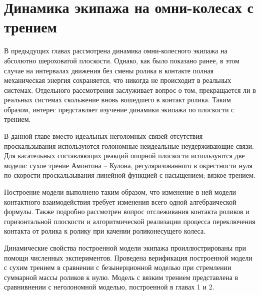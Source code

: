 \chapter{Динамика экипажа на омни-колесах с трением}

В предыдущих главах рассмотрена динамика омни-колесного экипажа на абсолютно шероховатой плоскости. Однако, как было показано ранее, в этом случае на интервалах движения без смены ролика в контакте полная механическая энергия сохраняется, что никогда не происходит в реальных системах. Отдельного рассмотрения заслуживает вопрос о том, прекращается ли в реальных системах скольжение вновь вошедшего в контакт ролика. Таким образом, 
интерес представляет изучение динамики экипажа по плоскости с трением.

В данной главе вместо идеальных неголомных связей отсутствия проскальзывания используются голономные неидеальные неудерживающие связи. Для касательных составляющих реакций опорной плоскости используются две модели: сухое трение Амонтона -- Кулона, регуляризованного в окрестности нуля по скорости проскальзывания линейной функцией с насыщением; вязкое трением.

Построение модели выполнено таким образом, что изменение в ней модели контактного взаимодействия требует изменения всего одной алгебраической формулы. 
Также подробно рассмотрен вопрос отслеживания контакта роликов и горизонтальной плоскости и алгоритмической реализации процесса  переключения контакта от ролика к ролику при качении  роликонесущего колеса.

Динамические свойства построенной модели экипажа проиллюстрированы при помощи численных экспериментов.
Проведена верификация построенной модели с сухим трением в сравнении с безынерционной моделью при стремлении суммарной массы роликов к нулю. Модель с вязким трением представлена в сравнивнении с неголономной моделью, построенной в главах 1 и 2.